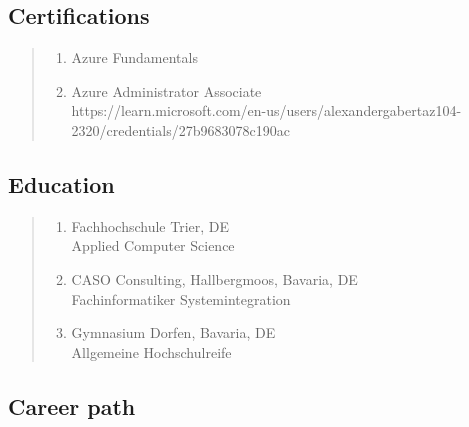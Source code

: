 \documentclass[a4paper]{report}
\begin{document}
\begin{flushleft}
\section*{Certifications}
\end{flushleft}
    
\begin{quote}
\begin{enumerate}

\item[\textbf{AZ-900}]
                    Azure Fundamentals

\item[\textbf{AZ-104}]
                    Azure Administrator Associate\\
                    https://learn.microsoft.com/en-us/users/alexandergabertaz104-2320/credentials/27b9683078c190ac

\end{enumerate}
\end{quote}

\begin{flushleft}
\section*{Education}
\end{flushleft}

\begin{quote}
\begin{enumerate}

\item[2004 - 2007]  Fachhochschule Trier, DE\\
                    Applied Computer Science

\item[1997 - 1999]  CASO Consulting, Hallbergmoos, Bavaria, DE\\
                    Fachinformatiker Systemintegration

\item[1996]         Gymnasium Dorfen, Bavaria, DE\\
                    Allgemeine Hochschulreife

\end{enumerate}
\end{quote}

\clearpage

\begin{flushleft}
\section*{Career path}
\end{flushleft}
\end{document}
